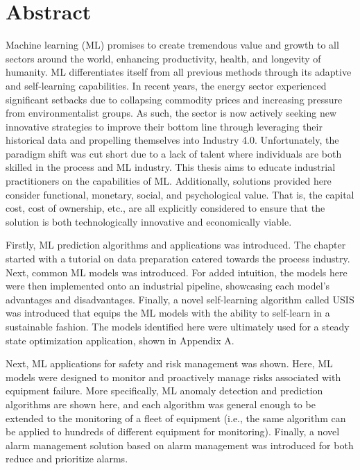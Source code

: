 \documentclass[12pt]{report}
\begin{document}
\chapter*{Abstract}

Machine learning (ML) promises to create tremendous value and growth to all sectors around the world, enhancing productivity, health, and longevity of humanity. ML differentiates itself from all previous methods through its adaptive and self-learning capabilities. In recent years, the energy sector experienced significant setbacks due to collapsing commodity prices and increasing pressure from environmentalist groups.  As such, the sector is now actively seeking new innovative strategies to improve their bottom line through leveraging their historical data and propelling themselves into Industry 4.0. Unfortunately, the paradigm shift was cut short due to a lack of talent where individuals are both skilled in the process and ML industry. This thesis aims to educate industrial practitioners on the capabilities of ML. Additionally, solutions provided here consider functional, monetary, social, and psychological value.  That is, the capital cost, cost of ownership, etc., are all explicitly considered to ensure that the solution is both technologically innovative and economically viable. 

Firstly, ML prediction algorithms and applications was introduced. The chapter started with a tutorial on data preparation catered towards the process industry.  Next, common ML models was introduced.  For added intuition, the models here were then implemented onto an industrial pipeline, showcasing each model's advantages and disadvantages.  Finally, a novel self-learning algorithm called USIS was introduced that equips the ML models with the ability to self-learn in a sustainable fashion. The models identified here were ultimately used for a steady state optimization application, shown in Appendix A.

Next, ML applications for safety and risk management was shown.  Here, ML models were designed to monitor and proactively manage risks associated with equipment failure. More specifically, ML anomaly detection and prediction algorithms are shown here, and each algorithm was general enough to be extended to the monitoring of a fleet of equipment (i.e., the same algorithm can be applied to hundreds of different equipment for monitoring). Finally, a novel alarm management solution based on alarm management was introduced for both reduce and prioritize alarms.
\end{document}
